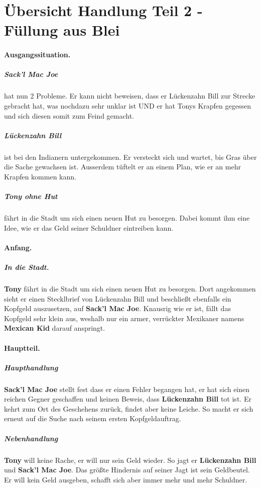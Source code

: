\documentclass[12pt,a4paper,german]{book}
\begin{document}
%
\section{Übersicht Handlung Teil 2 - Füllung aus Blei}

\paragraph{Ausgangssituation.}
    \subparagraph{Sack'l Mac Joe} hat nun 2 Probleme.
    Er kann nicht beweisen, dass er Lückenzahn Bill zur Strecke gebracht hat, was nochdazu sehr unklar ist UND er hat Tonys Krapfen gegessen und sich diesen somit zum Feind gemacht.
    \subparagraph{Lückenzahn Bill} ist bei den Indianern untergekommen.
    Er versteckt sich und wartet, bis Gras über die Sache gewachsen ist. Ausserdem tüftelt er an einem Plan, wie er an mehr Krapfen kommen kann.
    \subparagraph{Tony ohne Hut} fährt in die Stadt um sich einen neuen Hut zu besorgen.
    Dabei kommt ihm eine Idee, wie er das Geld seiner Schuldner eintreiben kann.

\paragraph{Anfang.}
    \subparagraph{In die Stadt.}
    \textbf{Tony} fährt in die Stadt um sich einen neuen Hut zu besorgen. Dort angekommen sieht er einen Stecklbrief von Lückenzahn Bill und beschließt ebenfalls ein Kopfgeld auszusetzen, auf \textbf{Sack'l Mac Joe}. Knausrig wie er ist, fällt das Kopfgeld sehr klein aus, weshalb nur ein armer, verrückter Mexikaner namens \textbf{Mexican Kid} darauf anspringt.

\paragraph{Hauptteil.}
   
\subparagraph{Haupthandlung}
    \textbf{Sack'l Mac Joe} stellt fest dass er einen Fehler begangen hat, er hat sich einen reichen Gegner geschaffen und keinen Beweis, dass \textbf{Lückenzahn Bill} tot ist. Er kehrt zum Ort des Geschehens zurück, findet aber keine Leiche. So macht er sich erneut auf die Suche nach seinem ersten Kopfgeldauftrag.
\subparagraph{Nebenhandlung}
    \textbf{Tony} will keine Rache, er will nur sein Geld wieder. So jagt er \textbf{Lückenzahn Bill} und \textbf{Sack'l Mac Joe}. Das größte Hindernis auf seiner Jagt ist sein Geldbeutel. Er will kein Geld ausgeben, schafft sich aber immer mehr und mehr Schuldner.
\end{document}
